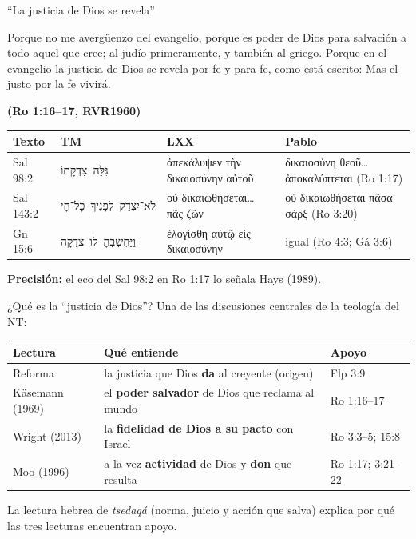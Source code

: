 \documentclass[hyperref={bookmarks=false},aspectratio=169]{beamer}
\newcommand{\heb}[1]{\mbox{\foreignlanguage{hebrew}{#1}}}
\newcommand{\grc}[1]{\foreignlanguage{ancientgreek}{#1}}
\newcommand{\fuente}[1]{\par\hfill{\upshape\bfseries\footnotesize\textcolor{azul}{#1}}}
\newcommand{\destacar}[1]{\textbf{\textcolor{azul}{#1}}}
\newcommand{\precision}[1]{{\footnotesize\color{gris}\textbf{Precisión:} #1}}
\begin{document}
\begin{frame}{``La justicia de Dios se revela''}
\begin{cita}Porque no me avergüenzo del evangelio, porque es poder de Dios para salvación a todo aquel que cree; al judío primeramente, y también al griego. Porque en el evangelio la justicia de Dios se revela por fe y para fe, como está escrito: Mas el justo por la fe vivirá.\fuente{(Ro 1:16--17, RVR1960)}\end{cita}
\scriptsize\renewcommand{\arraystretch}{1.12}
\begin{tabular}{@{}>{\RaggedRight\arraybackslash}p{1.3cm}>{\RaggedRight\arraybackslash}p{3.1cm}>{\RaggedRight\arraybackslash}p{3.5cm}>{\RaggedRight\arraybackslash}p{3.4cm}@{}}
\toprule
\textbf{Texto} & \textbf{TM} & \textbf{LXX} & \textbf{Pablo} \\ \midrule
Sal 98:2 & \heb{גִּלָּה צִדְקָתוֹ} & \grc{ἀπεκάλυψεν τὴν δικαιοσύνην αὐτοῦ} & \grc{δικαιοσύνη θεοῦ\ldots{} ἀποκαλύπτεται} (Ro 1:17) \\
Sal 143:2 & \heb{לֹא־יִצְדַּק לְפָנֶיךָ כָל־חָי} & \grc{οὐ δικαιωθήσεται\ldots{} πᾶς ζῶν} & \grc{οὐ δικαιωθήσεται πᾶσα σάρξ} (Ro 3:20) \\
Gn 15:6 & \heb{וַיַּחְשְׁבֶהָ לּוֹ צְדָקָה} & \grc{ἐλογίσθη αὐτῷ εἰς δικαιοσύνην} & igual (Ro 4:3; Gá 3:6) \\
\bottomrule
\end{tabular}\par
\precision{el eco del Sal 98:2 en Ro 1:17 lo señala Hays (1989).}
\end{frame}

\begin{frame}{¿Qué es la ``justicia de Dios''?}
\small Una de las discusiones centrales de la teología del NT:\par\medskip
\scriptsize\renewcommand{\arraystretch}{1.25}
\begin{tabular}{@{}>{\RaggedRight\arraybackslash}p{3.0cm}>{\RaggedRight\arraybackslash}p{5.6cm}>{\RaggedRight\arraybackslash}p{3.4cm}@{}}
\toprule
\textbf{Lectura} & \textbf{Qué entiende} & \textbf{Apoyo} \\ \midrule
Reforma & la justicia que Dios \destacar{da} al creyente (origen) & Flp 3:9 \\
Käsemann (1969) & el \destacar{poder salvador} de Dios que reclama al mundo & Ro 1:16--17 \\
Wright (2013) & la \destacar{fidelidad de Dios a su pacto} con Israel & Ro 3:3--5; 15:8 \\
Moo (1996) & a la vez \destacar{actividad} de Dios y \destacar{don} que resulta & Ro 1:17; 3:21--22 \\
\bottomrule
\end{tabular}\par\medskip
\small La lectura hebrea de \emph{tsedaqá} (norma, juicio y acción que salva) explica por qué las tres lecturas encuentran apoyo.
\end{frame}
\end{document}
